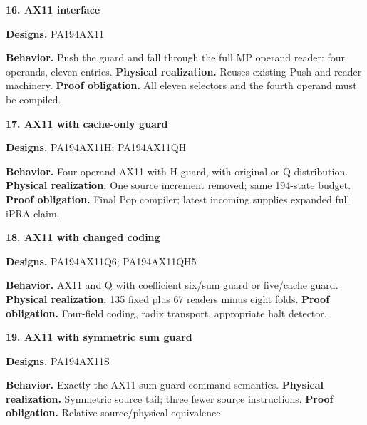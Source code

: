 \documentclass[10pt,a4paper]{article}
\begin{document}
\par\medskip\begin{samepage}\noindent\textbf{16. AX11 interface}\par\nobreak
\textbf{Designs.} PA194\allowbreak{}AX11\allowbreak{}

\textbf{Behavior.} Push the guard and fall through the full MP operand reader: four operands, eleven entries. \textbf{Physical realization.} Reuses existing Push and reader machinery. \textbf{Proof obligation.} All eleven selectors and the fourth operand must be compiled.
\end{samepage}

\par\medskip\begin{samepage}\noindent\textbf{17. AX11 with cache-only guard}\par\nobreak
\textbf{Designs.} PA194\allowbreak{}AX11\allowbreak{}H;\allowbreak{} PA194\allowbreak{}AX11\allowbreak{}QH

\textbf{Behavior.} Four-operand AX11 with H guard, with original or Q distribution. \textbf{Physical realization.} One source increment removed; same 194-state budget. \textbf{Proof obligation.} Final Pop compiler; latest incoming supplies expanded full iPRA claim.
\end{samepage}

\par\medskip\begin{samepage}\noindent\textbf{18. AX11 with changed coding}\par\nobreak
\textbf{Designs.} PA194\allowbreak{}AX11\allowbreak{}Q6;\allowbreak{} PA194\allowbreak{}AX11\allowbreak{}QH5

\textbf{Behavior.} AX11 and Q with coefficient six/sum guard or five/cache guard. \textbf{Physical realization.} 135 fixed plus 67 readers minus eight folds. \textbf{Proof obligation.} Four-field coding, radix transport, appropriate halt detector.
\end{samepage}

\par\medskip\begin{samepage}\noindent\textbf{19. AX11 with symmetric sum guard}\par\nobreak
\textbf{Designs.} PA194\allowbreak{}AX11\allowbreak{}S

\textbf{Behavior.} Exactly the AX11 sum-guard command semantics. \textbf{Physical realization.} Symmetric source tail; three fewer source instructions. \textbf{Proof obligation.} Relative source/physical equivalence.
\end{samepage}
\end{document}
